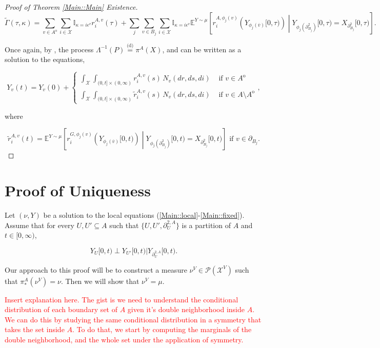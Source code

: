 \documentclass[12pt]{article}
\newcommand{\mb}{\mathbb}
\newcommand{\mc}{\mathcal}
\newcommand{\ov}{\overline}
\newcommand{\te}{\text}
\newcommand{\ep}{\epsilon}
\newcommand{\tr}{\textcolor{red}}
\newcommand{\ind}{\hspace{24pt}}
\newcommand{\exmu}[2]{\mb{E}^{#1}\left[#2\right]}	%
\newcommand{\deq}{\overset{\text{(d)}}{=}}			%
\newcommand{\pmsr}{\mc{P}}							%
\newcommand{\sta}{\mc{X}}							%
\newcommand{\neigh}[1]{\partial_{#1}}				%
\newcommand{\dneigh}[1]{\partial^2_{#1}}			%
\newcommand{\dgneigh}[2]{\partial^{2,#1}_{#2}}		%
\newcommand{\cl}[1]{\ov{#1}}						%
\newcommand{\Xf}{X}									%
\newcommand{\poiss}{N}								%
\newcommand{\rate}{r}								%
\newcommand{\m}{\mu}								%
\newcommand{\proj}{\pi}								%
\newcommand{\poissv}[1]{_{#1}}						%
\newcommand{\vind}[1]{_{#1}}						%
\newcommand{\tme}[1]{(#1)}							%
\newcommand{\tmi}[1]{#1}							%
\newcommand{\vpara}[1]{^{#1}}						%
\newcommand{\stpara}[1]{_{#1}}						%
\newcommand{\gvpara}[2]{^{#1,#2}}					%
\newcommand{\psf}{_*}								%
\newcommand{\Xg}{Y}									%
\newcommand{\brate}{\alt{\rate}}					%
\newcommand{\inte}[1]{{#1}^\mathrm{o}}				%
\newcommand{\alt}[1]{\tilde{#1}}					%
\newcommand{\pmap}{\Lambda}							%
\newcommand{\rt}{\tau}								%
\renewcommand{\mark}{\kappa}						%
\newcommand{\ratee}{\Gamma}							%
\newcommand{\rp}{P}									%
\newcommand{\mm}{\nu}								%
\newcommand{\ev}[1]{\ep^{#1}}						%
\begin{document}
\begin{proof}[Proof of Theorem \ref{Main::Main} Existence]
\[\alt{\ratee}(\rt,\mark) = \sum_{v \in \inte{A}}\sum_{i\in \sta} \mb{I}_{\mark = i\ev{v}}\rate\gvpara{A}{v}\stpara{i}\tme{\rt} + \sum_j\sum_{v \in B_j}\sum_{i \in \sta} \mb{I}_{\mark = i\ev{v}}\exmu{\Xg\sim \m}{\rate\gvpara{A}{\phi_j(v)}\stpara{i}\left(\Xg\vind{\phi_j(\cl{v})}\tmi{[0,\rt)}\right)\middle|\Xg\vind{\phi_j(\dneigh{B_j})}\tmi{[0,\rt)} = \Xf\vind{\dneigh{B_j}}\tmi{[0,\rt)}}.\]

Once again, by \cite[Exercise 14.7.1]{DalVer08}, the process \(\pmap^{-1}(\rp) \deq \proj\vpara{A}(\Xf)\), and can be written as a solution to the equations,

\[\Xg\vind{v}\tme{t} = \Xg\vind{v}\tme{0} + \begin{cases}
\int_\sta\int_{(0,t]\times (0,\infty)} \rate\gvpara{A}{v}\stpara{i}\tme{s}\,\poiss\poissv{v}(dr,ds,di) &\te{ if } v \in \inte{A}\\
\int_\sta\int_{(0,t]\times (0,\infty)} \brate\gvpara{A}{v}\stpara{i}\tme{s}\,\poiss\poissv{v}(dr,ds,di) &\te{ if } v \in A\setminus\inte{A}
\end{cases},\]

where

\[\brate\gvpara{A}{v}\stpara{i}\tme{t} = \exmu{\Xg\sim \m}{\rate\gvpara{G}{\phi_j(v)}\stpara{i}\left(\Xg\vind{\phi_j(\cl{v})}\tmi{[0,t)}\right)\middle|\Xg\vind{\phi_j(\dneigh{B_j})}\tmi{[0,t)} = \Xf\vind{\dneigh{B_j}}\tmi{[0,t)}}\te{ if } v \in \neigh{B_j}.\]

\end{proof}

\section{Proof of Uniqueness}
\label{Uq}

Let \((\mm,\Xg)\) be a solution to the local equations (\eqref{Main::local}-\eqref{Main::fixed}). Assume that for every \(U,U' \subseteq A\) such that \(\{U,U',\dgneigh{A}{U}\}\) is a partition of \(A\) and \(t \in [0,\infty)\),

\[\Xg\vind{U}\tmi{[0,t)} \perp \Xg\vind{U'}\tmi{[0,t)} |\Xg\vind{\dgneigh{A}{U}}\tmi{[0,t)}.\]

Our approach to this proof will be to construct a measure \(\mm\vpara{V} \in \pmsr(\sta^V)\) such that \(\proj\psf\vpara{A}(\mm\vpara{V}) = \mm\). Then we will show that \(\mm\vpara{V} = \m\). 

\ind \tr{Insert explanation here. The gist is we need to understand the conditional distribution of each boundary set of \(A\) given it's double neighborhood inside \(A\). We can do this by studying the same conditional distribution in a symmetry that takes the set inside \(A\). To do that, we start by computing the marginals of the double neighborhood, and the whole set under the application of symmetry.}
\end{document}
